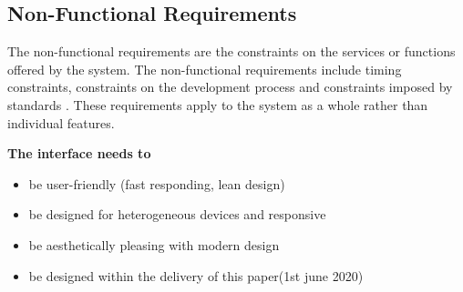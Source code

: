\subsection{Non-Functional Requirements}
The non-functional requirements are the constraints on the services or functions offered by the system. The non-functional requirements include timing constraints, constraints on the development process and constraints imposed by standards \cite{Sommerville:2010:SE:1841764} . These requirements apply to the system as a whole rather than individual features. 

\textbf{The interface needs to}
\begin{itemize}
\item be user-friendly (fast responding, lean design)
\item be designed for heterogeneous devices and responsive
\item be aesthetically pleasing with modern design
\item be designed within the delivery of this paper(1st june 2020)
\end{itemize}
    